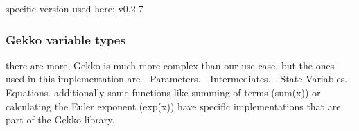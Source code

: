 specific version used here: v0.2.7

\subsubsection{Gekko variable types}
there are more, Gekko is much more complex than our use case, but the ones used in this implementation are
- Parameters. 
- Intermediates. 
- State Variables.  
- Equations.
additionally some functions like summing of terms (sum(x)) or calculating the Euler exponent (exp(x)) have specific implementations that are part of the Gekko library.
